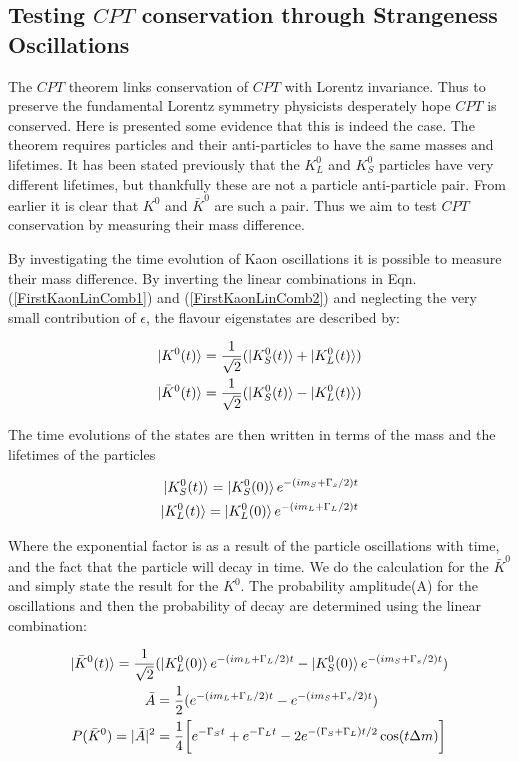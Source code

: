 \subsection{Testing $CPT$ conservation through Strangeness Oscillations}

The $CPT$ theorem links conservation of $CPT$ with Lorentz invariance. Thus to preserve the fundamental Lorentz symmetry physicists desperately hope $CPT$ is conserved. Here is presented some evidence that this is indeed the case. The theorem requires particles and their anti-particles to have the same masses and lifetimes. It has been stated previously that the $K^{0}_{L}$ and $K^{0}_{S}$ particles have very different lifetimes, but thankfully these are not a particle anti-particle pair. From earlier it is clear that $K^{0}$ and $\bar{K}^{0}$ are such a pair. Thus we aim to test $CPT$ conservation by measuring their mass difference.    

By investigating the time evolution of Kaon oscillations it is possible to measure their mass difference. By inverting the linear combinations in Eqn.(\ref{FirstKaonLinComb1}) and (\ref{FirstKaonLinComb2}) and neglecting the very small contribution of $\epsilon$, the flavour eigenstates are described by:

\begin{align*}
\ket{K^{0}(t)} = \frac{1}{\sqrt{2}} (\ket{K^{0}_{S}(t)} + \ket{K^{0}_{L}(t)}) \\
\ket{\bar{K}^{0}(t)}= \frac{1}{\sqrt{2}} (\ket{K^{0}_{S}(t)} - \ket{K^{0}_{L}(t)})
\end{align*} 

\noindent The time evolutions of the states are then written in terms of the mass and the lifetimes of the particles

\begin{align*}
\ket{K^{0}_{S}(t)} = \ket{K^{0}_{S}(0)} e^{-(im_{S}+\Gamma_{s}/2)t} \\
\ket{K^{0}_{L}(t)} = \ket{K^{0}_{L}(0)} e^{-(im_{L}+\Gamma_{L}/2)t} 
\end{align*} 

\noindent Where the exponential factor is as a result of the particle oscillations with time, and the fact that the particle will decay in time. We do the calculation for the $\bar{K}^{0}$ and simply state the result for the $K^{0}$. The probability amplitude(A) for the oscillations and then the probability of decay are determined using the linear combination:

\begin{align}
\ket{\bar{K}^{0}(t)} = \frac{1}{\sqrt{2}} & (\ket{K^{0}_{L}(0)} e^{-(im_{L}+\Gamma_{L}/2)t} - \ket{K^{0}_{S}(0)} e^{-(im_{S}+\Gamma_{s}/2)t}) \\
\bar{A} & = \frac{1}{2} (e^{-(im_{L}+\Gamma_{L}/2)t} - e^{-(im_{S}+\Gamma_{s}/2)t}) \\
\label{StrangenessOscillations1}
P(\bar{K}^{0}) = |\bar{A}|^{2} & = \frac{1}{4} \bigg[ e^{-\Gamma_{S}t} + e^{-\Gamma_{L}t} -2 e^{-(\Gamma_{S} + \Gamma_{L})t/2} \cos(t \Delta m )\bigg] \\
\end{align}

